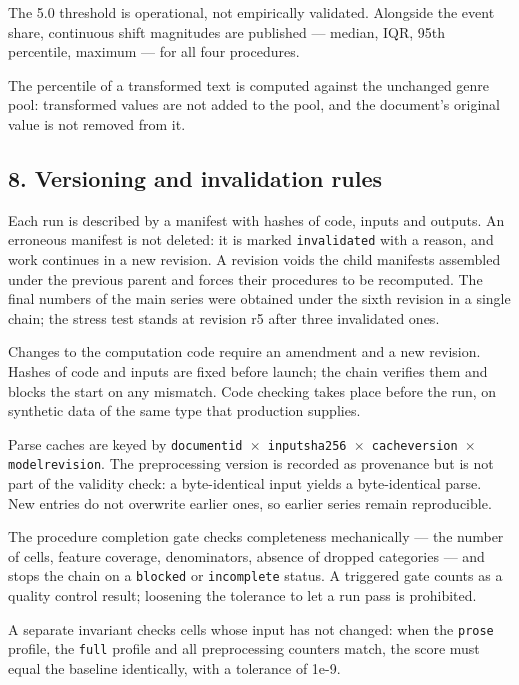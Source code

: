\documentclass[11pt,a4paper]{article}
\renewcommand{\_}{\textunderscore\allowbreak}
\begin{document}
The 5.0 threshold is operational, not empirically validated. Alongside the event
share, continuous shift magnitudes are published — median, IQR, 95th percentile,
maximum — for all four procedures.

The percentile of a transformed text is computed against the unchanged genre pool:
transformed values are not added to the pool, and the document's original value is
not removed from it.

\subsection{8. Versioning and invalidation rules}

Each run is described by a manifest with hashes of code, inputs and outputs. An
erroneous manifest is not deleted: it is marked \texttt{invalidated} with a reason, and
work continues in a new revision. A revision voids the child manifests assembled
under the previous parent and forces their procedures to be recomputed. The final
numbers of the main series were obtained under the sixth revision in a single
chain; the stress test stands at revision r5 after three invalidated ones.

Changes to the computation code require an amendment and a new revision. Hashes of
code and inputs are fixed before launch; the chain verifies them and blocks the
start on any mismatch. Code checking takes place before the run, on synthetic data
of the same type that production supplies.

Parse caches are keyed by \texttt{document\_id $\times$ input\_sha256 $\times$ cache\_version $\times$
model\_revision}. The preprocessing version is recorded as provenance but is not
part of the validity check: a byte-identical input yields a byte-identical parse.
New entries do not overwrite earlier ones, so earlier series remain reproducible.

The procedure completion gate checks completeness mechanically — the number of
cells, feature coverage, denominators, absence of dropped categories — and stops
the chain on a \texttt{blocked} or \texttt{incomplete} status. A triggered gate counts as a
quality control result; loosening the tolerance to let a run pass is prohibited.

A separate invariant checks cells whose input has not changed: when the \texttt{prose}
profile, the \texttt{full} profile and all preprocessing counters match, the score must
equal the baseline identically, with a tolerance of 1e-9.
\end{document}
